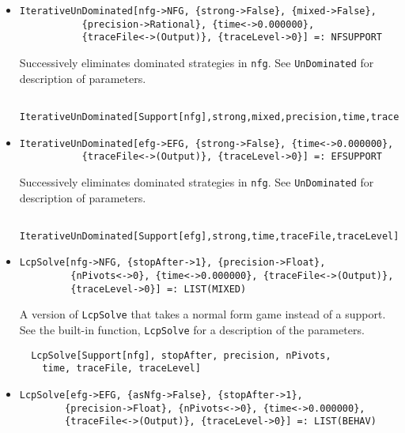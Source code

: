 \begin{itemize}
\item{}
\protect \large \begin{verbatim}
IterativeUnDominated[nfg->NFG, {strong->False}, {mixed->False}, 
           {precision->Rational}, {time<->0.000000}, 
           {traceFile<->(Output)}, {traceLevel->0}] =: NFSUPPORT 
\end{verbatim}\normalsize

\bd 
Successively eliminates dominated strategies in \verb+nfg+.  See
\verb+UnDominated+ for description of parameters.  
\begin{verbatim}
  IterativeUnDominated[Support[nfg],strong,mixed,precision,time,traceFile,traceLevel];
\end{verbatim} 
\ed

\item{}
\protect \large \begin{verbatim}
IterativeUnDominated[efg->EFG, {strong->False}, {time<->0.000000}, 
           {traceFile<->(Output)}, {traceLevel->0}] =: EFSUPPORT 
\end{verbatim}\normalsize

\bd 
Successively eliminates dominated strategies in \verb+nfg+. See
\verb+UnDominated+ for description of parameters.  
\begin{verbatim}
  IterativeUnDominated[Support[efg],strong,time,traceFile,traceLevel];
\end{verbatim} 
\ed




\item{}
\protect \large \begin{verbatim}
LcpSolve[nfg->NFG, {stopAfter->1}, {precision->Float}, 
         {nPivots<->0}, {time<->0.000000}, {traceFile<->(Output)}, 
         {traceLevel->0}] =: LIST(MIXED) 
\end{verbatim}\normalsize

\bd 
A version of \verb+LcpSolve+ that takes a normal form
game instead of a support.  See the built-in function,
\verb+LcpSolve+ for a description of the parameters.
\begin{verbatim}
  LcpSolve[Support[nfg], stopAfter, precision, nPivots,
    time, traceFile, traceLevel]
\end{verbatim} 
\ed

\item{}
\protect \large \begin{verbatim}
LcpSolve[efg->EFG, {asNfg->False}, {stopAfter->1}, 
        {precision->Float}, {nPivots<->0}, {time<->0.000000}, 
        {traceFile<->(Output)}, {traceLevel->0}] =: LIST(BEHAV) 
\end{verbatim}\normalsize


\end{itemize}
